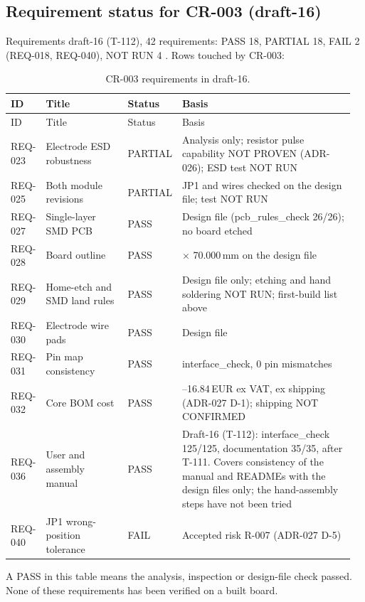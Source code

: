 \subsection{Requirement status for CR-003 (draft-16)}

Requirements draft-16 (T-112), 42 requirements: PASS 18, PARTIAL 18, FAIL 2
(REQ-018, REQ-040), NOT RUN 4 . Rows
touched by CR-003:

{\small
\begin{longtable}{@{}>{\raggedright\arraybackslash}p{0.10\linewidth}>{\raggedright\arraybackslash}p{0.24\linewidth}>{\raggedright\arraybackslash}p{0.11\linewidth}>{\raggedright\arraybackslash}p{0.51\linewidth}@{}}
\caption{CR-003 requirements in draft-16.}\label{tab:v13-req}\\
\toprule
ID & Title & Status & Basis \\
\midrule\endfirsthead
\toprule ID & Title & Status & Basis \\ \midrule\endhead
REQ-023 & Electrode ESD robustness & PARTIAL & Analysis only; resistor pulse capability NOT PROVEN (ADR-026); ESD test NOT RUN \\
REQ-025 & Both module revisions & PARTIAL & JP1 and wires checked on the design file; test NOT RUN \\
REQ-027 & Single-layer SMD PCB & PASS & Design file (pcb\_rules\_check 26/26); no board etched \\
REQ-028 & Board outline & PASS & 100.000 $\times$ 70.000\,mm on the design file \\
REQ-029 & Home-etch and SMD land rules & PASS & Design file only; etching and hand soldering NOT RUN; first-build list above \\
REQ-030 & Electrode wire pads & PASS & Design file \\
REQ-031 & Pin map consistency & PASS & interface\_check, 0 pin mismatches \\
REQ-032 & Core BOM cost & PASS & 14.84--16.84\,EUR ex VAT, ex shipping (ADR-027 D-1); shipping NOT CONFIRMED \\
REQ-036 & User and assembly manual & PASS & Draft-16 (T-112): interface\_check 125/125, documentation 35/35, after T-111. Covers consistency of the manual and READMEs with the design files only; the hand-assembly steps have not been tried \\
REQ-040 & JP1 wrong-position tolerance & FAIL & Accepted risk R-007 (ADR-027 D-5) \\
\bottomrule
\end{longtable}
}

A PASS in this table means the analysis, inspection or design-file check passed.
None of these requirements has been verified on a built board.
